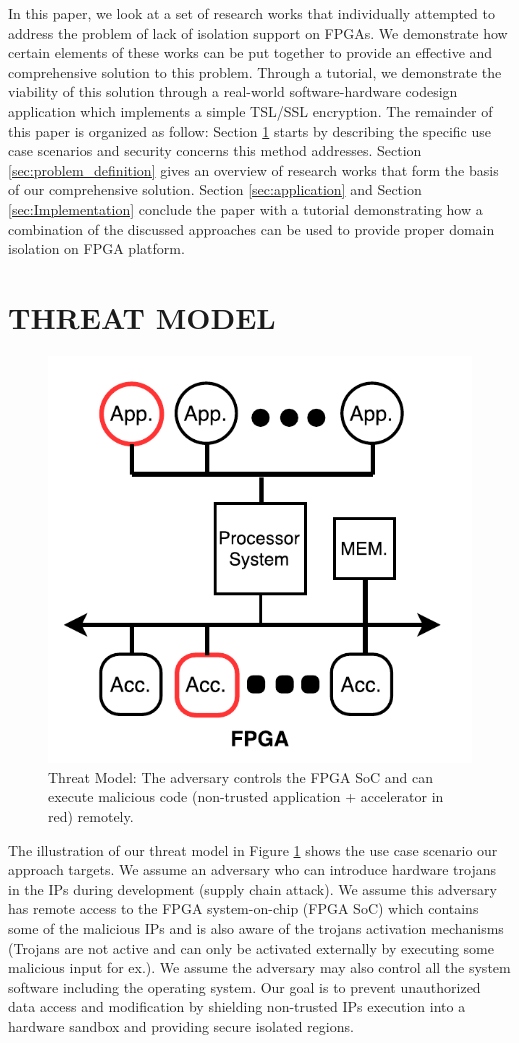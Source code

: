 \documentclass[sigconf]{acmart}
\theoremstyle{plain}
\theoremstyle{remark}
\begin{document}
In this paper, we look at a set of  research works that individually attempted to address the problem of lack of isolation support on FPGAs. We demonstrate how certain elements of these works can be put together to provide an effective and comprehensive solution to this problem. Through a tutorial, we demonstrate the viability of this solution through a real-world software-hardware codesign application which implements a simple TSL/SSL encryption. The remainder of this paper is organized as follow: Section \ref{sec:threat_model} starts by describing the specific use case scenarios and security concerns this method addresses. Section \ref{sec:problem_definition} gives an overview of research works that form the basis of our comprehensive solution. Section \ref{sec:application} and Section \ref{sec:Implementation} conclude the paper with a tutorial demonstrating how a combination of the discussed approaches can be used to provide proper domain isolation on FPGA platform.


\section{THREAT MODEL} \label{sec:threat_model}

\begin{figure}[hbt]
\centering
\includegraphics[width=0.5\columnwidth]{figures/ThreatModel.pdf}
\caption{Threat Model: The adversary controls the FPGA SoC and can execute malicious code (non-trusted application + accelerator in red) remotely.}
\label{fig:threat}
\end{figure}

The illustration of our threat model in Figure \ref{fig:threat} shows the use case scenario our approach targets. We assume an adversary who can introduce hardware trojans in the IPs during development (supply chain attack). We assume this adversary has remote access to the FPGA system-on-chip (FPGA SoC) which contains some of the malicious IPs and is also aware of the trojans activation mechanisms (Trojans are not active and can only be activated externally by executing some malicious input for ex.). We assume the adversary may also control all the system software including the operating system. Our goal is to prevent unauthorized data access and modification by shielding non-trusted IPs execution into a hardware sandbox and providing secure isolated regions.
\end{document}
